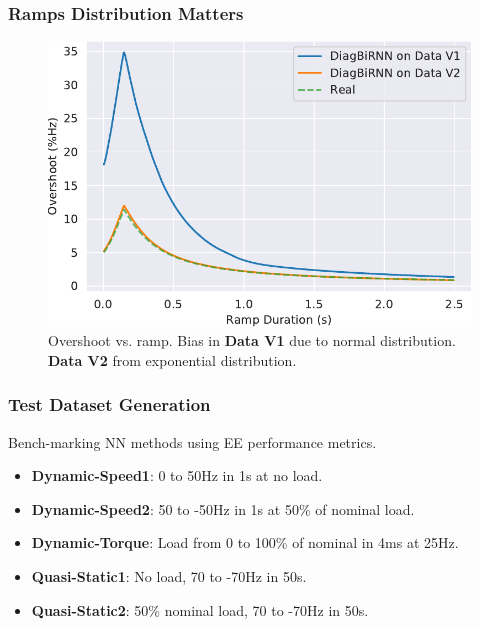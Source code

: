 \documentclass{beamer}
\begin{document}
\begin{frame}
\frametitle{Ramps Distribution Matters}
\begin{figure}[ht!]
    \centering
    \includegraphics[scale=0.5]{images/goodbad.pdf}
    \caption{Overshoot vs. ramp. Bias in \textbf{Data V1} due to normal distribution. \textbf{Data V2} from exponential distribution.}
    \label{fig:goodbad}
    \vspace{-1em}
\end{figure}

\end{frame}


\begin{frame}
\frametitle{Test Dataset Generation}

Bench-marking NN methods using EE performance metrics.
\begin{itemize}
    \item \textbf{Dynamic-Speed1}: 0 to 50Hz in 1s at no load.
    \item \textbf{Dynamic-Speed2}: 50 to -50Hz in 1s at 50\% of nominal load.
    \item \textbf{Dynamic-Torque}: Load from 0 to 100\% of nominal in 4ms at 25Hz.
    \item \textbf{Quasi-Static1}: No load, 70 to -70Hz in 50s.
    \item \textbf{Quasi-Static2}: 50\% nominal load, 70 to -70Hz in 50s.
\end{itemize}
\end{frame}
\end{document}
